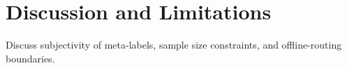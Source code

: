 \section{Discussion and Limitations}
Discuss subjectivity of meta-labels, sample size constraints, and offline-routing boundaries.

